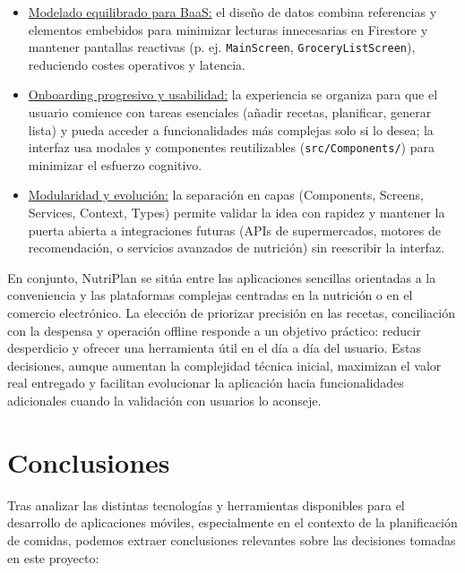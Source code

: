\documentclass[twoside, openright, 11pt]{report}
\begin{document}
\begin{enumerate}
\begin{itemize}
			\item \underline{Modelado equilibrado para BaaS:} el diseño de datos combina referencias y elementos embebidos para minimizar lecturas innecesarias en Firestore y mantener pantallas reactivas (p. ej. \texttt{MainScreen}, \texttt{GroceryListScreen}), reduciendo costes operativos y latencia.
			
			\item \underline{Onboarding progresivo y usabilidad:} la experiencia se organiza para que el usuario comience con tareas esenciales (añadir recetas, planificar, generar lista) y pueda acceder a funcionalidades más complejas solo si lo desea; la interfaz usa modales y componentes reutilizables (\texttt{src/Components/}) para minimizar el esfuerzo cognitivo.
			
			\item \underline{Modularidad y evolución:} la separación en capas (Components, Screens, Services, Context, Types) permite validar la idea con rapidez y mantener la puerta abierta a integraciones futuras (APIs de supermercados, motores de recomendación, o servicios avanzados de nutrición) sin reescribir la interfaz.
		\end{itemize}
		
			
			En conjunto, NutriPlan se sitúa entre las aplicaciones sencillas orientadas a la conveniencia y las plataformas complejas centradas en la nutrición o en el comercio electrónico. La elección de priorizar precisión en las recetas, conciliación con la despensa y operación offline responde a un objetivo práctico: reducir desperdicio y ofrecer una herramienta útil en el día a día del usuario. Estas decisiones, aunque aumentan la complejidad técnica inicial, maximizan el valor real entregado y facilitan evolucionar la aplicación hacia funcionalidades adicionales cuando la validación con usuarios lo aconseje.

	\section{Conclusiones}
	Tras analizar las distintas tecnologías y herramientas disponibles para el desarrollo de aplicaciones móviles, especialmente en el contexto de la planificación de comidas, podemos extraer conclusiones relevantes sobre las decisiones tomadas en este proyecto:
	

\end{enumerate}
\end{document}
